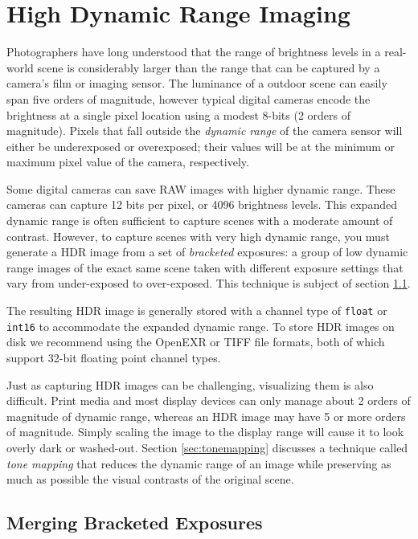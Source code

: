 \chapter{High Dynamic Range Imaging}\label{ch:hdr-imaging}

Photographers have long understood that the range of brightness levels in
a real-world scene is considerably larger than the range that can be
captured by a camera's film or imaging sensor.  The luminance of a
outdoor scene can easily span five orders of magnitude, however
typical digital cameras encode the brightness at a single pixel
location using a modest 8-bits (2 orders of magnitude).  Pixels that
fall outside the {\em dynamic range} of the camera sensor will either
be underexposed or overexposed; their values will be at the minimum or
maximum pixel value of the camera, respectively.

Some digital cameras can save RAW images with higher dynamic range.
These cameras can capture 12 bits per pixel, or 4096 brightness
levels.  This expanded dynamic range is often sufficient to capture
scenes with a moderate amount of contrast. However, to capture scenes
with very high dynamic range, you must generate a HDR image from a set
of {\em bracketed} exposures: a group of low dynamic range images of
the exact same scene taken with different exposure settings that vary
from under-exposed to over-exposed.  This technique is subject of
section \ref{sec:hdr_merge}.

The resulting HDR image is generally stored with a channel type of
{\tt float} or {\tt int16} to accommodate the expanded dynamic range.
To store HDR images on disk we recommend using the OpenEXR or TIFF
file formats, both of which support 32-bit floating point channel
types.

Just as capturing HDR images can be challenging, visualizing them is
also difficult.  Print media and most display devices can only manage
about 2 orders of magnitude of dynamic range, whereas an HDR image may
have 5 or more orders of magnitude. Simply scaling the image to the
display range will cause it to look overly dark or washed-out. Section
\ref{sec:tonemapping} discusses a technique called {\em tone mapping}
that reduces the dynamic range of an image while preserving as much as
possible the visual contrasts of the original scene.

\section{Merging Bracketed Exposures}
\label{sec:hdr_merge}

